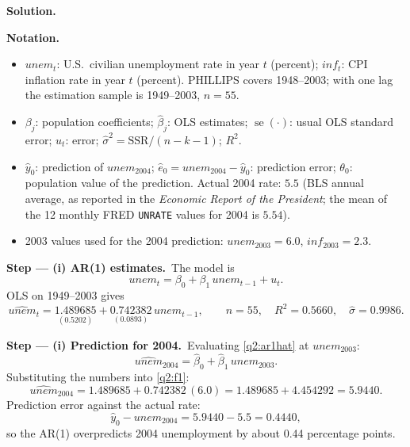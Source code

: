 \documentclass[11pt,a4paper]{article}
\numberwithin{equation}{questao}   %
\newenvironment{notacao}{\par\smallskip\noindent\textbf{Notation.}\begin{itemize}[leftmargin=1.4em,topsep=1pt,itemsep=0pt]\small}{\end{itemize}}
\newcommand{\passo}[2]{\par\smallskip\noindent\textbf{Step --- #1.}~#2}
\newcommand{\solhead}{\par\medskip\noindent{\color{blue!55!black}\rule{\linewidth}{0.3pt}}\par\noindent\textbf{Solution.}}
\begin{document}
\begin{sol}
\solhead
\begin{notacao}
\item $unem_t$: U.S.\ civilian unemployment rate in year $t$ (percent); $inf_t$: CPI inflation rate
  in year $t$ (percent). PHILLIPS covers 1948--2003; with one lag the estimation sample is
  1949--2003, $n=55$.
\item $\beta_j$: population coefficients; $\hat\beta_j$: OLS estimates; $\operatorname{se}(\cdot)$:
  usual OLS standard error; $u_t$: error; $\hat\sigma^2=\mathrm{SSR}/(n-k-1)$; $R^2$.
\item $\hat y_0$: prediction of $unem_{2004}$; $\hat e_0=unem_{2004}-\hat y_0$: prediction error;
  $\theta_0$: population value of the prediction. Actual 2004 rate: $5.5$ (BLS annual average,
  as reported in the \textit{Economic Report of the President}; the mean of the 12 monthly FRED
  \texttt{UNRATE} values for 2004 is $5.54$).
\item 2003 values used for the 2004 prediction: $unem_{2003}=6.0$, $inf_{2003}=2.3$.
\end{notacao}

\passo{(i) AR(1) estimates}{The model is}
\begin{equation}\label{q2:ar1}
unem_t=\beta_0+\beta_1\,unem_{t-1}+u_t .
\end{equation}
OLS on 1949--2003 gives
\begin{equation}\label{q2:ar1hat}
\widehat{unem}_t=\underset{(0.5202)}{1.489685}+\underset{(0.0893)}{0.742382}\,unem_{t-1},
\qquad n=55,\quad R^2=0.5660,\quad \hat\sigma=0.9986 .
\end{equation}

\passo{(i) Prediction for 2004}{Evaluating \eqref{q2:ar1hat} at $unem_{2003}$:}
\begin{equation}\label{q2:f1}
\widehat{unem}_{2004}=\hat\beta_0+\hat\beta_1\,unem_{2003}.
\end{equation}
Substituting the numbers into \eqref{q2:f1}:
\[
\widehat{unem}_{2004}=1.489685+0.742382\,(6.0)=1.489685+4.454292=5.9440 .
\]
Prediction error against the actual rate:
\[
\hat y_0-unem_{2004}=5.9440-5.5=0.4440 ,
\]
so the AR(1) overpredicts 2004 unemployment by about 0.44 percentage points.


\end{sol}
\end{document}
